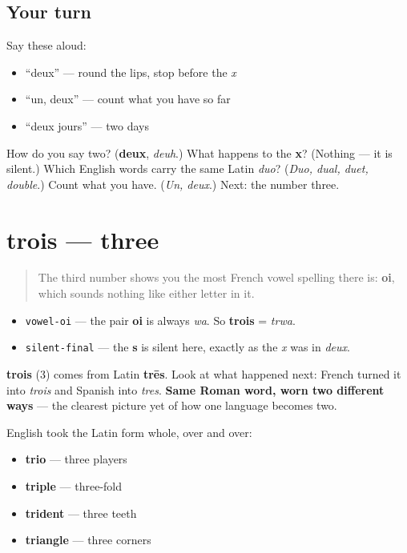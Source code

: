 \subsection*{Your turn}
Say these aloud:

\begin{itemize}
\raggedright
  \item \textquotedblleft{}deux\textquotedblright{} — round the lips, stop before the \emph{x}
  \item \textquotedblleft{}un, deux\textquotedblright{} — count what you have so far
  \item \textquotedblleft{}deux jours\textquotedblright{} — two days
\end{itemize}

\begin{tcolorbox}[breakable,colback=teal!4,colframe=teal!35!black,title={Before you move on}]
How do you say two? (\textbf{deux}, \emph{deuh}.) What happens to the \textbf{x}? (Nothing — it is silent.) Which English words carry the same Latin \emph{duo}? (\emph{Duo, dual, duet, double}.) Count what you have. (\emph{Un, deux}.) Next: the number three.
\end{tcolorbox}
\section[trois]{trois — three}

\label{lesson:FR-C06-trois}



\begin{quote}
The third number shows you the most French vowel spelling there is: \textbf{oi}, which sounds nothing like either letter in it.
\end{quote}

\begin{sounds}
\begin{itemize}
\raggedright
  \item \texttt{vowel-oi} — the pair \textbf{oi} is always \emph{wa}. So \textbf{trois} = \emph{trwa}.
  \item \texttt{silent-final} — the \textbf{s} is silent here, exactly as the \emph{x} was in \emph{deux}.
\end{itemize}
\end{sounds}

\begin{cousinweb}
\textbf{trois} (3) comes from Latin \textbf{trēs}. Look at what happened next: French turned it into \emph{trois} and Spanish into \emph{tres}. \textbf{Same Roman word, worn two different ways} — the clearest picture yet of how one language becomes two.

English took the Latin form whole, over and over:

\begin{itemize}
\raggedright
  \item \textbf{trio} — three players
  \item \textbf{triple} — three-fold
  \item \textbf{trident} — three teeth
  \item \textbf{triangle} — three corners
\end{itemize}
\end{cousinweb}

